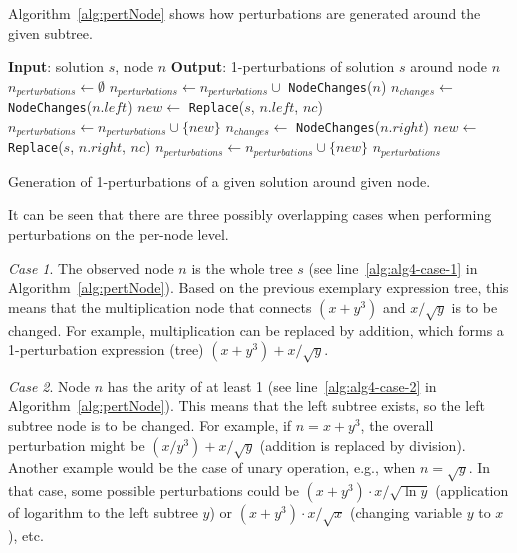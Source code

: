 \documentclass{bmcart}
\begin{document}
Algorithm~\ref{alg:pertNode} shows how perturbations are generated around the given subtree.

\begin{algorithm}	
	 
	\begin{algorithmic}[1]
		\Statex  \textbf{Input}: solution $s$, node $n$ 
		\Statex  \textbf{Output}: 1-perturbations of solution $s$ around node $n$
		\State $n_{perturbations} \gets \emptyset$
		 \label{alg:alg4-case-1}
		\State $n_{perturbations} \gets n_{perturbations} \cup$ \texttt{NodeChanges}($n$)
		\EndIf
		\label{alg:alg4-case-2}
		\State $n_{changes} \gets$ \texttt{NodeChanges}($n.left$)
		\State $new \gets$ \texttt{Replace}($s$, $n.left$, $nc$)
		\State $n_{perturbations} \gets n_{perturbations} \cup \{new\}$
		\EndFor
		\EndIf
		\label{alg:alg4-case-3}
		\State $n_{changes} \gets$ \texttt{NodeChanges}($n.right$)
		\State $new \gets$ \texttt{Replace}($s$, $n.right$, $nc$)
		\State $n_{perturbations} \gets n_{perturbations} \cup \{new\}$
		\EndFor
		\EndIf
		\State \Return $n_{perturbations}$
		\EndProcedure
	\end{algorithmic}
	\caption{Generation of 1-perturbations of a given solution around given node.}
	\label{alg:pertNode}
\end{algorithm}

It can be seen that there are three possibly overlapping cases when performing perturbations on the per-node level. 

\emph{Case 1}. 
The observed node $n$ is the whole tree $s$ (see line~\ref{alg:alg4-case-1} in Algorithm~\ref{alg:pertNode}). Based on  the previous exemplary expression tree, this means that the multiplication node that connects $(x+y^3)$ and $x/\sqrt{y}$ is to be changed. For example, multiplication can be replaced by addition, which forms a 1-perturbation expression (tree) $(x+y^3)+ x/\sqrt{y}$. 


\emph{Case 2}. 
Node $n$ has the arity of at least 1 (see line~\ref{alg:alg4-case-2} in Algorithm~\ref{alg:pertNode}). This means that the left subtree exists, so the left subtree node is to be changed. 
For example, if $n=x+y^3$, the overall perturbation might be $(x/y^3)+x/\sqrt{y}$ (addition is replaced by division). 
Another example would be the case of unary operation, e.g., when $n=\sqrt{y}$. In that case, some possible perturbations could be $(x+y^3)\cdot x/\sqrt{\ln{y}}$ (application of logarithm to the left subtree $y$) or $(x+y^3)\cdot x/\sqrt{x}$ (changing variable $y$ to $x$), etc.
\end{document}
